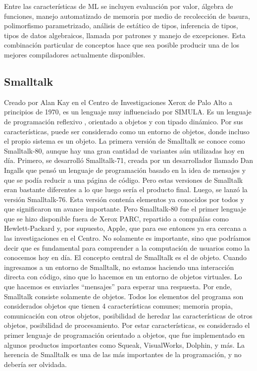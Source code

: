 \documentclass[twoside,twocolumn]{article}
\begin{document}
Entre las características de ML se incluyen evaluación por valor, álgebra de funciones, manejo automatizado de memoria por medio de recolección de basura, polimorfismo parametrizado, análisis de estático de tipos, inferencia de tipos, tipos de datos algebraicos, llamada por patrones y manejo de excepciones. Esta combinación particular de conceptos hace que sea posible producir una de los mejores compiladores actualmente disponibles.

\subsection{Smalltalk}
Creado por Alan Kay en el Centro de Investigaciones Xerox de Palo Alto a principios de 1970, es un lenguaje muy influenciado por SIMULA. Es un lenguaje de programación reflexivo , orientado a objetos y con tipado dinámico. Por sus características, puede ser considerado como un entorno de objetos, donde incluso el propio sistema es un objeto. La primera versión de Smalltalk se conoce como Smalltalk-80, aunque hay una gran cantidad de variantes aún utilizadas hoy en día. Primero, se desarrolló Smalltalk-71, creada por un desarrollador llamado Dan Ingalls que pensó un lenguaje de programación basado en la idea de mensajes y que se podía reducir a una página de código. Pero estas versiones de Smalltalk eran bastante diferentes a lo que luego sería el producto final. Luego, se lanzó la versión Smalltalk-76. Esta versión contenía elementos ya conocidos por todos y que significaron un avance importante. Pero Smalltalk-80 fue el primer lenguaje que se hizo disponible fuera de Xerox PARC, repartido a compañías como Hewlett-Packard y, por supuesto, Apple, que para ese entonces ya era cercana a las investigaciones en el Centro. No solamente es importante, sino que podríamos decir que es fundamental para comprender a la computación de usuarios como la conocemos hoy en día. El concepto central de Smalltalk es el de objeto. Cuando ingresamos a un entorno de Smalltalk, no estamos haciendo una interacción directa con código, sino que lo hacemos en un entorno de objetos virtuales. Lo que hacemos es enviarles “mensajes” para esperar una respuesta. Por ende, Smalltalk consiste solamente de objetos. Todos los elementos del programa son considerados objetos que tienen 4 características comunes; memoria propia, comunicación con otros objetos, posibilidad de heredar las características de otros objetos, posibilidad de procesamiento. Por estar características, es considerado el primer lenguaje de programación orientado a objetos, que fue implementado en algunos productos importantes como Squeak, VisualWorks, Dolphin, y más. La herencia de Smalltalk es una de las más importantes de la programación, y no debería ser olvidada.
\end{document}
